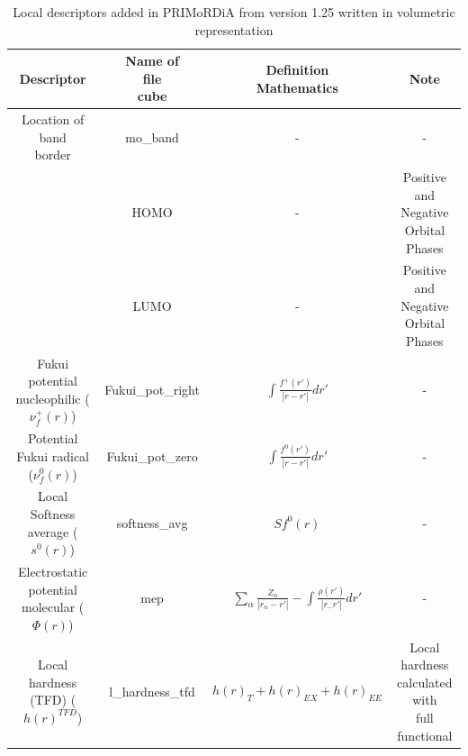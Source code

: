 \documentclass[a4paper,11pt]{refart}
\begin{document}
\hspace*{-\leftmarginwidth}
\begin{minipage}{\fullwidth}
	\begin{table}[H]
		\centering
		\caption{Local descriptors added in PRIMoRDiA from version 1.25 written in volumetric representation}
		\begin{tabular}{c|c|c|c}
			\toprule
			Descriptor &\makecell{Name of\\file\\cube}&\makecell{Definition\\Mathematics}& Note \\
			\midrule
			\makecell{Location of band\\border} & mo\_band & - & - \\\hline
			\makecell{HOMO ($\phi(r)^N$) } & HOMO & - & \makecell{Positive and\\ Negative Orbital Phases} \\\hline
			\makecell{LUMO ($\phi(r)^{N+1}$) } & LUMO & - & \makecell{Positive and\\ Negative Orbital Phases} \\\hline
			\makecell{Fukui potential\\ nucleophilic ($\nu_{f}^{+}(r)$)} & Fukui\_pot\_right & $\int \frac{f^{+}(r')}{| r - r'|}dr'$ & - \\\hline
			\makecell{Potential Fukui\\ radical ($\nu_{f}^{0}(r)$)} & Fukui\_pot\_zero & $\int \frac{f^{0}(r')}{| r - r'|}dr'$ & - \\\hline
			\makecell{Local Softness \\average ($s^{0}(r)$)} & softness\_avg & $Sf^{0}(r)$ & - \\\hline
			\makecell{Electrostatic potential\\molecular ($\Phi(r)$) } & mep & $\sum_{\alpha} \frac{Z_{\alpha}}{|r_{\alpha}-r'|} - \int\frac{\rho(r')}{|r_-r'|}dr'$& - \\\hline
			\makecell{Local hardness \\(TFD) ($h(r)^{TFD}$)} & l\_hardness\_tfd & $h(r)_{T} + h(r)_{EX}+h (r)_{EE}$ & \makecell{Local hardness \\calculated with \\full functional} \\
			\bottomrule
		\end{tabular}
		\label{tab_local3}
	\end{table}
\end{minipage}
\end{document}
